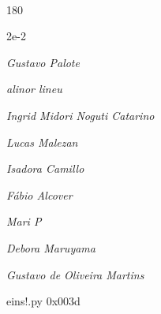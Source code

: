\documentclass[12pt]{article}
\begin{document}

\pagebreak			

	\ 
	\vfill
	\begin{turn}{180}	
		\begin{minipage}{\textwidth}
		  	\ttfamily %
			\centering
			{\Huge 2e-2}
		  
			\hfill
		  
			

\textit{\small Gustavo Palote}

\textit{\small alinor lineu}

\textit{\small Ingrid Midori Noguti Catarino}

\textit{\small Lucas Malezan}

\textit{\small Isadora Camillo}

\textit{\small Fábio Alcover}

\textit{\small Mari P}

\textit{\small Debora Maruyama}

\textit{\small Gustavo de Oliveira Martins}

\bigskip

eins!.py
0x003d


		\end{minipage}	
	\end{turn}
	\vfill
	\

\pagebreak
\end{document}
